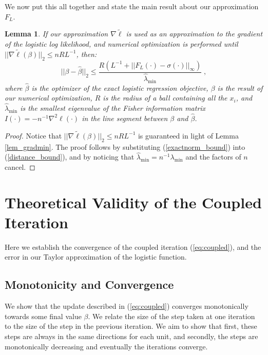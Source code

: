 \documentclass[11pt]{article}
\newcommand{\norm}[1]{||#1||}
\newtheorem{lem}[thm]{Lemma}
\begin{document}
We now put this all together and state the main result about our approximation $F_L$.

\begin{lem}
If our approximation $\nabla\tilde{\ell}$ is used as an approximation to the gradient of the logistic log likelihood, and numerical optimization is performed until $||\nabla\tilde{\ell}(\beta)||_2 \leq nRL^{-1}$, then:
\begin{equation}  ||\beta-\hat{\beta}||_2 \leq \frac{R(L^{-1} + \norm{F_L(\cdot)-\sigma(\cdot)}_\infty)}{\hat{\lambda}_{\text{min}}} \; ,\end{equation}
where $\hat{\beta}$ is the optimizer of the exact logistic regression objective, $\beta$ is the result of our numerical optimization, $R$ is the radius of a ball containing all the $x_i$, and $\hat{\lambda}_{\text{min}}$ is the smallest eigenvalue of the Fisher information matrix $I(\cdot) = -n^{-1}\nabla^2\ell(\cdot)$ in the line segment between $\beta$ and $\hat{\beta}$. \end{lem}
\begin{proof}
Notice that $||\nabla\tilde{\ell}(\beta)||_2 \leq nRL^{-1}$ is guaranteed in light of Lemma \ref{lem_gradmin}. The proof follows by substituting (\ref{exactnorm_bound}) into (\ref{distance_bound}), and by noticing that $\hat{\lambda}_{\text{min}} = n^{-1}\lambda_{\text{min}}$ and  the factors of $n$ cancel.
\end{proof}


\section{Theoretical Validity of the Coupled Iteration}\label{sec:validity_2}

Here we establish the convergence of the coupled iteration (\ref{eq:coupled}), and the error in our Taylor approximation of the logistic function.


\subsection{Monotonicity and Convergence}\label{sec:convergence}

We show that the update described in (\ref{eq:coupled}) converges monotonically towards some final value $\beta$.  We  relate the size of the step taken at one iteration  to the size of the step in the previous iteration.  We aim to show that first, these steps are always in the same directions for each unit, and secondly, the steps are monotonically decreasing and eventually the iterations converge.
\end{document}
